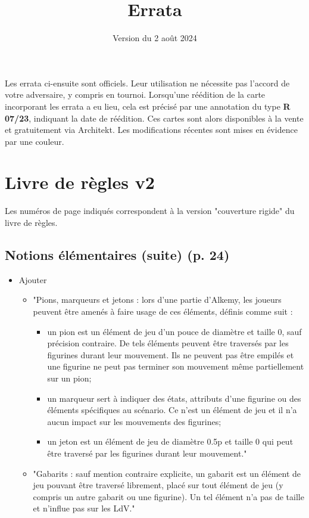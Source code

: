 \documentclass[a4paper,12pt]{article}
\title{Errata}
\author{}
\date{Version du 2 août 2024}
\begin{document}
	
	\maketitle
	\begin{multicols}{2}
		Les errata ci-ensuite sont officiels. Leur utilisation ne nécessite pas l’accord de votre adversaire, y compris en tournoi. Lorsqu’une réédition de la carte incorporant les errata a eu lieu, cela est précisé par une annotation du type \textbf{R 07/23}, indiquant la date de réédition. Ces cartes sont alors disponibles à la vente et gratuitement via Architekt. Les modifications récentes sont mises en évidence par une couleur.
		
		\section*{Livre de règles v2}
		Les numéros de page indiqués correspondent à la version "couverture rigide" du livre de règles.
		
		\subsection*{Notions élémentaires (suite) (p. 24)}
		\begin{itemize}
			\item Ajouter
			\begin{itemize}
				\item "Pions, marqueurs et jetons : lors d’une partie d’Alkemy, les joueurs peuvent être amenés à faire usage de ces éléments, définis comme suit :
				\begin{itemize}
					\item un pion est un élément de jeu d’un pouce de diamètre et taille 0, sauf précision contraire. De tels éléments peuvent être traversés par les figurines durant leur mouvement. Ils ne peuvent pas être empilés et une figurine ne peut pas terminer son mouvement même partiellement sur un pion;
					\item un marqueur sert à indiquer des états, attributs d’une figurine ou des éléments spécifiques au scénario. Ce n’est un élément de jeu et il n’a aucun impact sur les mouvements des figurines;
					\item un jeton est un élément de jeu de diamètre 0.5p et taille 0 qui peut être traversé par les figurines durant leur mouvement."
				\end{itemize}
				\item "Gabarits : sauf mention contraire explicite, un gabarit est un élément de jeu pouvant être traversé librement, placé sur tout élément de jeu (y compris un autre gabarit ou une figurine). Un tel élément n’a pas de taille et n’influe pas sur les LdV."
			\end{itemize}
		\end{itemize}
		

\end{multicols}
\end{document}
